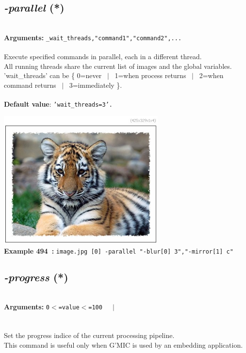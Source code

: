 \documentclass[a4paper,11pt,twoside]{book}
\begin{document}
\subsection{\emph{-parallel} (*)}\vspace*{-0.5em}
~\\\textbf{Arguments: } 
{\small \texttt{\_wait\_threads,"command1","command2",...}}\\~\\
Execute specified commands in parallel, each in a different thread.
~\\All running threads share the current list of images and the global variables.
~\\'wait\_threads' can be \{ 0=never ~$|$~ 1=when process returns ~$|$~ 2=when command returns ~$|$~ 3=immediately \}.
~\\~\\\textbf{Default value}: {\small \texttt{'wait\_threads=3'.}}
\begin{center}\includegraphics[keepaspectratio=true,height=7cm,width=\textwidth]{img/gmic_def494.jpg}\\
{\footnotesize \textbf{Example 494~:} \texttt{image.jpg [0] -parallel "-blur[0] 3","-mirror[1] c"}}
\end{center}

\subsection{\emph{-progress} (*)}\vspace*{-0.5em}
~\\\textbf{Arguments: } 
{\small \texttt{0$<$=value$<$=100}}~~~$|$\\
\\~\\
Set the progress indice of the current processing pipeline.
~\\This command is useful only when G'MIC is used by an embedding application.
\end{document}
